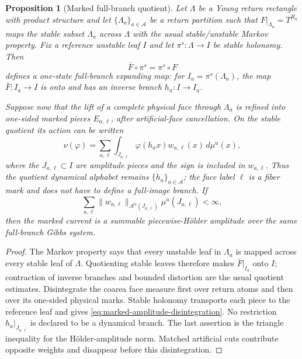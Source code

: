 \documentclass[11pt]{article}
\newtheorem{proposition}[theorem]{Proposition}
\begin{document}
\begin{proposition}[Marked full-branch quotient]
\label{prop:marked-full-branch-quotient}
Let $\Lambda$ be a Young return rectangle with product structure and let
$\{\Lambda_a\}_{a\in\mathcal A}$ be a return partition such that
$F|_{\Lambda_a}=T^{R_a}$ maps the stable subset $\Lambda_a$ across $\Lambda$
with the usual stable/unstable Markov property.  Fix a reference unstable
leaf $I$ and let $\pi^s:\Lambda\to I$ be stable holonomy.  Then
\[
 \bar F\circ\pi^s=\pi^s\circ F
\]
defines a one-state full-branch expanding map: for
$I_a=\pi^s(\Lambda_a)$, the map $\bar F:I_a\to I$ is onto and has an inverse
branch $h_a:I\to I_a$.

Suppose now that the lift of a complete physical face through $\Lambda_a$ is
refined into one-sided marked pieces $E_{a,\ell}$, after artificial-face
cancellation.  On the stable quotient its action can be written
\begin{equation}
\label{eq:marked-amplitude-disintegration}
 \nu(\varphi)=
 \sum_{a,\ell}\int_{J_{a,\ell}}
     \varphi(h_a x)w_{a,\ell}(x)\,d\mu^u(x),
\end{equation}
where the $J_{a,\ell}\subset I$ are amplitude pieces and the sign is included
in $w_{a,\ell}$.  Thus the quotient dynamical alphabet remains
$\{h_a\}_{a\in\mathcal A}$; the face label $\ell$ is a fiber mark and does
not have to define a full-image branch.  If
\[
 \sum_{a,\ell}\|w_{a,\ell}\|_{\mathcal A^\alpha(J_{a,\ell})}
      \mu^u(J_{a,\ell})<\infty,
\]
then the marked current is a summable piecewise-H\"older amplitude over the
same full-branch Gibbs system.
\end{proposition}

\begin{proof}
The Markov property says that every unstable leaf in $\Lambda_a$ is mapped
across every stable leaf of $\Lambda$.  Quotienting stable leaves therefore
makes $\bar F|_{I_a}$ onto $I$; contraction of inverse branches and bounded
distortion are the usual quotient estimates.  Disintegrate the coarea face
measure first over return atoms and then over its one-sided physical marks.
Stable holonomy transports each piece to the reference leaf and gives
\eqref{eq:marked-amplitude-disintegration}.  No restriction
$h_a|_{J_{a,\ell}}$ is declared to be a dynamical branch.  The last assertion
is the triangle inequality for the H\"older-amplitude norm.  Matched
artificial cuts contribute opposite weights and disappear before this
disintegration.
\end{proof}
\end{document}
